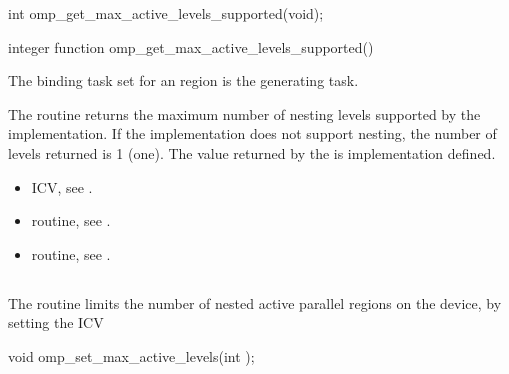 \format
\begin{ccppspecific}
\begin{ompcFunction}
int omp_get_max_active_levels_supported(void);
\end{ompcFunction}
\end{ccppspecific}

\begin{fortranspecific}
\begin{ompfFunction}
integer function omp_get_max_active_levels_supported()
\end{ompfFunction}
\end{fortranspecific}

\binding
The binding task set for an 
region is the generating task.

\effect
The  routine returns the maximum
number of nesting levels supported by the implementation.  If the implementation
does not support nesting, the number of levels returned is 1 (one).  The
value returned by the  is
implementation defined.

\crossreferences
\begin{itemize}
\item {} ICV, see
.

\item {} routine, see
.

\item {} routine, see
.
\end{itemize}








\subsection{}
\label{subsec:omp_set_max_active_levels}
\summary
The  routine limits the number of nested active
parallel regions on the device, by setting the  ICV


\format
\begin{ccppspecific}
\begin{ompcFunction}
void omp_set_max_active_levels(int );
\end{ompcFunction}
\end{ccppspecific}

